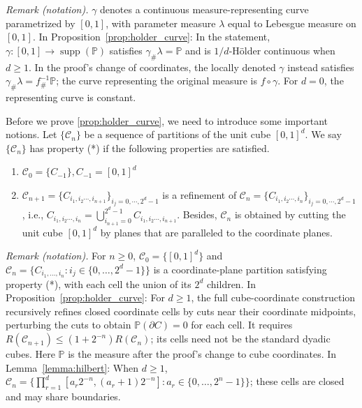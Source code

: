 \noindent\textit{Remark (notation).} $\gamma$ denotes a continuous measure-representing curve parametrized by $[0,1]$, with parameter measure $\lambda$ equal to Lebesgue measure on $[0,1]$. In Proposition~\ref{prop:holder_curve}: In the statement, $\gamma:[0,1]\rightarrow\operatorname{supp}(\mathbb{P})$ satisfies $\gamma_{\#}\lambda=\mathbb{P}$ and is $1/d$-H\"older continuous when $d\geqslant1$. In the proof's change of coordinates, the locally denoted $\gamma$ instead satisfies $\gamma_{\#}\lambda=f^{-1}_{\#}\mathbb{P}$; the curve representing the original measure is $f\circ\gamma$. For $d=0$, the representing curve is constant.


Before we prove \cref{prop:holder_curve}, we need to introduce some important notions. Let $ \{\mathcal{C}_{n}\}$ be a sequence of partitions of the unit cube $ [ 0,1]^{d}$. We say $ \{\mathcal{C}_{n}\}$ has property (*) if the following properties are satisfied.
\begin{enumerate}
\item $ \mathcal{C}_{0} =\{C_{-1}\} ,C_{-1} =[ 0,1]^{d}$
\item $ \mathcal{C}_{n+1} =\{C_{i_{1} ,i_{2} \cdots ,i_{n+1}}\}_{i_{j} =0,\cdots ,2^{d} -1}$ is a refinement of $ \mathcal{C}_{n} =\{C_{i_{1} ,i_{2} \cdots ,i_{n}}\}_{i_{j} =0,\cdots ,2^{d} -1}$, i.e., $ C_{i_{1} ,i_{2} \cdots ,i_{n}} =\bigcup _{i_{n+1} =0}^{2^{d} -1} C_{i_{1} ,i_{2} \cdots ,i_{n+1}}$. Besides, $ \mathcal{C}_n$ is obtained by cutting the unit cube $[0,1]^d$ by planes that are paralleled to the coordinate planes. 
\end{enumerate}

\noindent\textit{Remark (notation).} For $n\geqslant0$, $\mathcal{C}_0=\{[0,1]^d\}$ and $\mathcal{C}_n=\{C_{i_1,\ldots,i_n}:i_j\in\{0,\ldots,2^d-1\}\}$ is a coordinate-plane partition satisfying property (*), with each cell the union of its $2^d$ children. In Proposition~\ref{prop:holder_curve}: For $d\geqslant1$, the full cube-coordinate construction recursively refines closed coordinate cells by cuts near their coordinate midpoints, perturbing the cuts to obtain $\mathbb{P}(\partial C)=0$ for each cell. It requires $R(\mathcal{C}_{n+1})\leqslant(1+2^{-n})R(\mathcal{C}_n)$; its cells need not be the standard dyadic cubes. Here $\mathbb{P}$ is the measure after the proof's change to cube coordinates. In Lemma~\ref{lemma:hilbert}: When $d\geqslant1$, $\mathcal{C}_n=\{\prod_{r=1}^d[a_r2^{-n},(a_r+1)2^{-n}]:a_r\in\{0,\ldots,2^n-1\}\}$; these cells are closed and may share boundaries.


